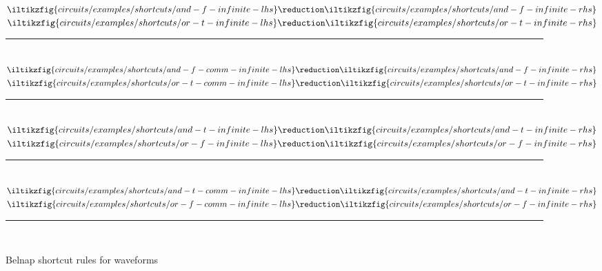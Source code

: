 \begin{figure}
    \centering
    \(
    \iltikzfig{circuits/examples/shortcuts/and-f-infinite-lhs}
    \reduction
    \iltikzfig{circuits/examples/shortcuts/and-f-infinite-rhs}
    \)
    \quad
    \(
    \iltikzfig{circuits/examples/shortcuts/or-t-infinite-lhs}
    \reduction
    \iltikzfig{circuits/examples/shortcuts/or-t-infinite-rhs}
    \)
    \\[0.3em]
    \rule{\textwidth}{0.1mm}
    \\[0.5em]
    \(
    \iltikzfig{circuits/examples/shortcuts/and-f-comm-infinite-lhs}
    \reduction
    \iltikzfig{circuits/examples/shortcuts/and-f-infinite-rhs}
    \)
    \quad
    \(
    \iltikzfig{circuits/examples/shortcuts/or-t-comm-infinite-lhs}
    \reduction
    \iltikzfig{circuits/examples/shortcuts/or-t-infinite-rhs}
    \)
    \\[0.3em]
    \rule{\textwidth}{0.1mm}
    \\[0.5em]
    \(
    \iltikzfig{circuits/examples/shortcuts/and-t-infinite-lhs}
    \reduction
    \iltikzfig{circuits/examples/shortcuts/and-t-infinite-rhs}
    \)
    \quad
    \(
    \iltikzfig{circuits/examples/shortcuts/or-f-infinite-lhs}
    \reduction
    \iltikzfig{circuits/examples/shortcuts/or-f-infinite-rhs}
    \)
    \\[0.3em]
    \rule{\textwidth}{0.1mm}
    \\[0.5em]
    \(
    \iltikzfig{circuits/examples/shortcuts/and-t-comm-infinite-lhs}
    \reduction
    \iltikzfig{circuits/examples/shortcuts/and-t-infinite-rhs}
    \)
    \quad
    \(
    \iltikzfig{circuits/examples/shortcuts/or-f-comm-infinite-lhs}
    \reduction
    \iltikzfig{circuits/examples/shortcuts/or-f-infinite-rhs}
    \)
    \\[0.3em]
    \rule{\textwidth}{0.1mm}
    \\[0.5em]
    \caption{Belnap shortcut rules for waveforms}
    \label{fig:shortcut-waveform-rules}
\end{figure}